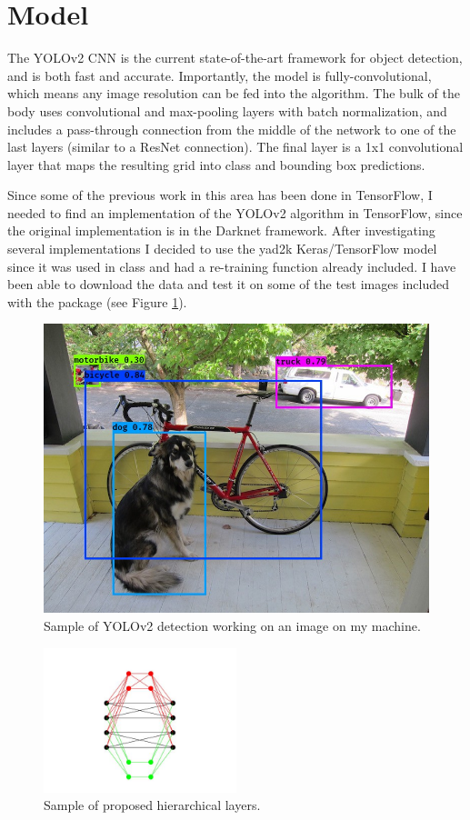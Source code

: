 \documentclass[10pt,letterpaper]{article}
\begin{document}
	\section{Model}
	The YOLOv2 CNN is the current state-of-the-art framework for object detection, and is both fast and accurate. Importantly, the model is fully-convolutional, which means any image resolution can be fed into the algorithm. The bulk of the body uses convolutional and max-pooling layers with batch normalization, and includes a pass-through connection from the middle of the network to one of the last layers (similar to a ResNet connection). The final layer is a 1x1 convolutional layer that maps the resulting grid into class and bounding box predictions.
	
	Since some of the previous work in this area has been done in TensorFlow, I needed to find an implementation of the YOLOv2 algorithm in TensorFlow, since the original implementation is in the Darknet framework. After investigating several implementations I decided to use the yad2k \cite{yad2k} Keras/TensorFlow model since it was used in class and had a re-training function already included. I have been able to download the data and test it on some of the test images included with the package (see Figure \ref{fig:dog}).
	
	\begin{figure}
		\centering
		\includegraphics[width=0.5\linewidth]{images/dog}
		\caption{Sample of YOLOv2 detection working on an image on my machine.}
		\label{fig:dog}
	\end{figure}
	
	\begin{figure}
		\centering
		\includegraphics[width=0.5\textwidth]{HNN}
		\caption{Sample of proposed hierarchical layers.}
		\label{fig:hnn}
	\end{figure}
	
\end{document}

